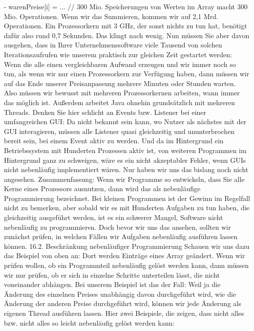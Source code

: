 -	warenPreise[i] = ...	
// 300 Mio. Speicherungen von Werten im Array macht 300 Mio. Operationen.
Wenn wir das Summieren, kommen wir auf 2,1 Mrd. Operationen. Ein Prozessorkern mit 3 GHz, der sonst nichts zu tun hat, benötigt dafür also rund 0,7 Sekunden. Das klingt nach wenig. Nun müssen Sie aber davon ausgehen, dass in Ihrer Unternehmenssoftware viele Tausend von solchen Iterationsaufrufen wie unserem praktisch zur gleichen Zeit gestartet werden: Wenn die alle einen vergleichbaren Aufwand erzeugen und wir immer noch so tun, als wenn wir nur einen Prozessorkern zur Verfügung haben, dann müssen wir auf das Ende unserer Preisanpassung mehrere Minuten oder Stunden warten. Also müssen wir bewusst mit mehreren Prozessorkernen arbeiten, wann immer das möglich ist.
Außerdem arbeitet Java ohnehin grundsätzlich mit mehreren Threads. Denken Sie hier schlicht an Events bzw. Listener bei einer umfangreichen GUI: Da nicht bekannt sein kann, wo Nutzer als nächstes mit der GUI interagieren, müssen alle Listener quasi gleichzeitig und ununterbrochen bereit sein, bei einem Event aktiv zu werden. Und da im Hintergrund ein Betriebssystem mit Hunderten Prozessen aktiv ist, von weiteren Programmen im Hintergrund ganz zu schweigen, wäre es ein nicht akzeptabler Fehler, wenn GUIs nicht nebenläufig implementiert wären. Nur haben wir uns das bislang noch nicht angesehen.
Zusammenfassung:
Wenn wir Programme so entwickeln, dass Sie alle Kerne eines Prozessors ausnutzen, dann wird das als nebenläufige Programmierung bezeichnet. Bei kleinen Programmen ist der Gewinn im Regelfall nicht zu bemerken, aber sobald wir es mit Hunderten Aufgaben zu tun haben, die gleichzeitig ausgeführt werden, ist es ein schwerer Mangel, Software nicht nebenläufig zu programmieren.
Doch bevor wir uns das ansehen, sollten wir zunächst prüfen, in welchen Fällen wir Aufgaben nebenläufig ausführen lassen können.
16.2.	Beschränkung nebenläufiger Programmierung
Schauen wir uns dazu das Beispiel von oben an: Dort werden Einträge eines Array geändert. Wenn wir prüfen wollen, ob ein Programmteil nebenläufig gelöst werden kann, dann müssen wir nur prüfen, ob er sich in einzelne Schritte unterteilen lässt, die nicht voneinander abhängen. Bei unserem Beispiel ist das der Fall: Weil ja die Änderung des einzelnen Preises unabhängig davon durchgeführt wird, wie die Änderung der anderen Preise durchgeführt wird, können wir jede Änderung als eigenen Thread ausführen lassen.
Hier zwei Beispiele, die zeigen, dass nicht alles bzw. nicht alles so leicht nebenläufig gelöst werden kann: 
